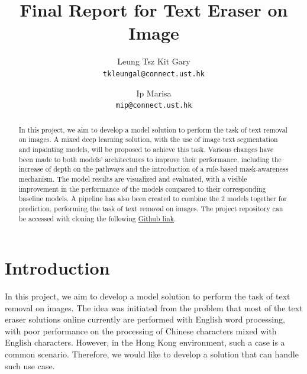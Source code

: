 \documentclass[10pt,twocolumn,letterpaper]{article}
\begin{document}
\title{Final Report for Text Eraser on Image}

\author{
Leung Tsz Kit Gary\\
{\tt\small tkleungal@connect.ust.hk}
\and
Ip Marisa\\
{\tt\small mip@connect.ust.hk}
}
\maketitle

\begin{abstract}
    In this project, we aim to develop a model solution to perform the task of text removal on images.
    A mixed deep learning solution, with the use of image text segmentation and inpainting models, will be proposed to achieve this task.
    Various changes have been made to both models' architectures to improve their performance, including the increase of depth on the pathways
    and the introduction of a rule-based mask-awareness mechanism. The model results are visualized and evaluated, with a visible improvement 
    in the performance of the models compared to their corresponding baseline models. 
    A pipeline has also been created to combine the 2 models together for prediction, performing the task of text removal on images.
    The project repository can be accessed with cloning the following \href{https://github.com/GLGDLY/ELEC4240_project}{Github link}.
\end{abstract}

\section{Introduction}
\label{sec:intro}

In this project, we aim to develop a model solution to perform the task of text removal on images. 
The idea was initiated from the problem that most of the text eraser solutions online currently are performed with English word processing, 
with poor performance on the processing of Chinese characters mixed with English characters. 
However, in the Hong Kong environment, such a case is a common scenario. Therefore, we would like to develop a solution that can handle such use case.
\end{document}
